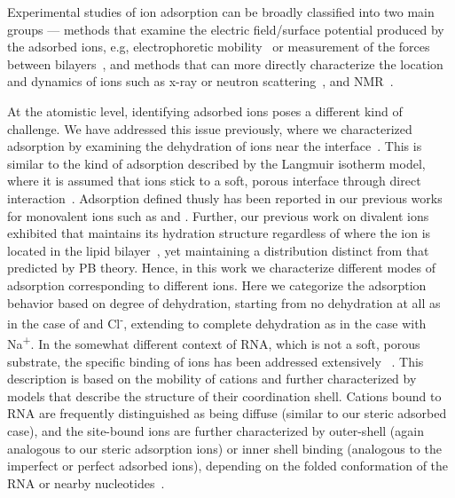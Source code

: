 Experimental studies of ion adsorption can be broadly
classified into two main groups --- methods that examine the electric field/surface potential
produced by the adsorbed ions, e.g, electrophoretic mobility~\cite{smith:2017:zeta} or 
measurement of the forces between 
bilayers~\cite{marra:1985:direct}, and methods
that can more directly characterize the location and dynamics of ions such 
as x-ray or neutron 
scattering~\cite{fogarty:2015,nagle:2000,pan:2012,panff:2012,uhrikova:2008,mason:2006:neutron}, and
NMR~\cite{nagle:2000,venable:2013,casal:1989}. 

At the atomistic level, identifying adsorbed ions poses a different kind of challenge.
We have addressed this issue previously,
where we characterized adsorption by examining the dehydration of ions near the
interface~\cite{kruczek:2019,kruczek:2017,pandit:2003:dppc:na,Berkowitz:2006}.
This is similar to the kind of adsorption described 
by the Langmuir isotherm model, where it is
assumed that ions stick to a soft, porous interface 
through direct interaction~\cite{kalinin:1996:ionbinding}.
Adsorption defined thusly has been reported in our previous works for monovalent ions 
such as \na{} and {\li{}}\cite{kruczek:2017,kruczek:2019,saunders:2019,saunders:2022}.
Further, our previous work on divalent ions
exhibited that \mg{} maintains its 
hydration {structure} regardless of where the ion is located in the 
lipid bilayer~\cite{kruczek:2019}, yet maintaining 
a distribution distinct from that
predicted by PB theory. Hence, {in this work
    we characterize different modes of adsorption corresponding
to different ions. Here we} categorize the 
adsorption behavior based on degree of 
dehydration, starting from no
dehydration at all as in the case of \mg{} and Cl\textsuperscript{-}, 
extending to complete dehydration as in the case with Na\textsuperscript{+}. 
In {the somewhat different} 
context of RNA, which is not a soft, 
porous substrate, the specific binding of ions has been addressed
extensively
~\cite{bowman:2012,rulivsek:2003:outer,dudev:2003,porschke:1979:mode,petrov:2005}.
This description is based on the mobility of cations and further 
characterized by models that describe the 
structure of their coordination shell.
Cations bound to RNA are frequently distinguished as
being diffuse {(similar to our steric adsorbed case)}, and the site-bound ions are further characterized
by outer-shell {(again analogous to our steric adsorption ions)} 
or inner shell binding 
{(analogous to the imperfect or perfect adsorbed ions)}, depending on
the folded conformation of the RNA or 
nearby nucleotides~\cite{bowman:2012,rulivsek:2003:outer,dudev:2003,porschke:1979:mode,petrov:2005}. 

